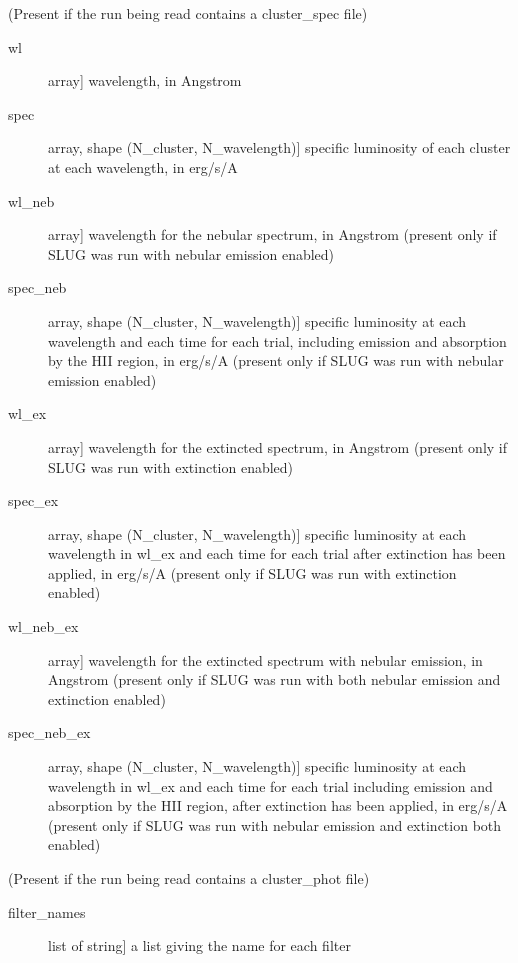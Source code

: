 \documentclass[letterpaper,10pt,english]{sphinxmanual}
\begin{document}
\begin{fulllineitems}
\begin{description}
\begin{description}
\end{description}

(Present if the run being read contains a cluster\_spec file)
\begin{description}
\item[{wl}] \leavevmode{[}array{]}
wavelength, in Angstrom

\item[{spec}] \leavevmode{[}array, shape (N\_cluster, N\_wavelength){]}
specific luminosity of each cluster at each wavelength, in erg/s/A

\item[{wl\_neb}] \leavevmode{[}array{]}
wavelength for the nebular spectrum, in Angstrom (present
only if SLUG was run with nebular emission enabled)

\item[{spec\_neb}] \leavevmode{[}array, shape (N\_cluster, N\_wavelength){]}
specific luminosity at each wavelength and each time for each
trial, including emission and absorption by the HII region,
in erg/s/A (present only if SLUG was run with nebular
emission enabled)

\item[{wl\_ex}] \leavevmode{[}array{]}
wavelength for the extincted spectrum, in Angstrom (present
only if SLUG was run with extinction enabled)

\item[{spec\_ex}] \leavevmode{[}array, shape (N\_cluster, N\_wavelength){]}
specific luminosity at each wavelength in wl\_ex and each
time for each trial after extinction has been applied, in
erg/s/A (present only if SLUG was run with extinction
enabled)

\item[{wl\_neb\_ex}] \leavevmode{[}array{]}
wavelength for the extincted spectrum with nebular emission,
in Angstrom (present only if SLUG was run with both nebular
emission and extinction enabled)

\item[{spec\_neb\_ex}] \leavevmode{[}array, shape (N\_cluster, N\_wavelength){]}
specific luminosity at each wavelength in wl\_ex and each
time for each trial including emission and absorption by the
HII region, after extinction has been applied, in erg/s/A
(present only if SLUG was run with nebular emission and
extinction both enabled)

\end{description}

(Present if the run being read contains a cluster\_phot file)
\begin{description}
\item[{filter\_names}] \leavevmode{[}list of string{]}
a list giving the name for each filter


\end{description}
\end{description}
\end{fulllineitems}
\end{document}
